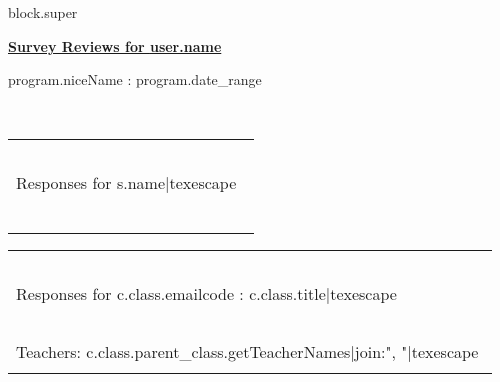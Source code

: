 {%
{%
{%
{{ block.super }}
{%

{\bf {\underline {\Large Survey Reviews for {{ user.name }}} \hspace{1in} }
\vspace*{0.1in}

\normalsize {{ program.niceName }}: {{ program.date_range }} } \\

\vspace{0.3in}

{%
\vspace{0.25in}
{%
    \begin{center}
    \begin{longtable}{|p{0.48\linewidth}|p{0.48\linewidth}|} \hline
    \multicolumn{2}{|C{\linewidth}|}{\cellcolor{esphead} ~ } \\
    \multicolumn{2}{|C{\linewidth}|}{\cellcolor{esphead} \Large {Responses for {{ s.name|texescape }}} } \\ 
    \multicolumn{2}{|C{\linewidth}|}{\cellcolor{esphead} ~ } \\\hline
    {%
        {%
            {%
        {%
    {%
    \end{longtable}
    \end{center}
    {%
        \clearpage
        \begin{center}
        \begin{longtable}{|p{0.48\linewidth}|p{0.48\linewidth}|} \hline
        \multicolumn{2}{|C{\linewidth}|}{\cellcolor{esphead} ~ } \\
        \multicolumn{2}{|C{\linewidth}|}{\cellcolor{esphead} \Large {Responses for {{ c.class.emailcode }}: {{ c.class.title|texescape }}} } \\ 
        \multicolumn{2}{|C{\linewidth}|}{\cellcolor{esphead} ~ } \\\hline
        \multicolumn{2}{|C{\linewidth}|}{
            \rule{0pt}{3ex}
            Teachers: {{ c.class.parent_class.getTeacherNames|join:", "|texescape }}
            \rule[-1.5ex]{0pt}{0pt} } \\\hline
        {%
            {%
                {%
            {%
        {%
        \end{longtable}
        \end{center}
    {%
{%


}}}}}}}}}

